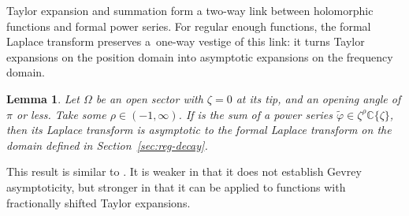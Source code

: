 \documentclass[10pt,a4paper]{amsart}
\newcommand{\singexp}[2]{\mathcal{H}L^\infty_{#1, #2}}
\newcommand{\C}{\mathbb{C}}
\newcommand{\series}[1]{\tilde{#1}}
\newcommand{\laplace}{\mathcal{L}}
\numberwithin{equation}{section}
\newtheorem{Lemma}[Theorem]{Lemma}
\begin{document}
Taylor expansion and summation form a two-way link between holomorphic functions and formal power series. For regular enough functions, the formal Laplace transform preserves a~one-way vestige of this link: it turns Taylor expansions on the position domain into asymptotic expansions on the frequency domain.
\begin{Lemma}\label{lem:laplace-bridge}
Let $\Omega$ be an open sector with $\zeta = 0$ at its tip, and an opening angle of $\pi$ or less. Take some $\rho \in (-1,\infty)$. If \smash{$\varphi \in \singexp{\rho}{\Lambda}(\Omega)$} is the sum of a power series $\series{\varphi} \in \zeta^\rho \C\{\zeta\}$, then its Laplace transform \smash{$\Phi = \laplace_{\zeta, 0}^\theta \varphi$} is asymptotic to the formal Laplace transform \smash{$\series{\Phi} = \laplace_{\zeta, 0}^\theta \series{\varphi}$} on the domain  defined in Section~{\rm\ref{sec:reg-decay}}.
\end{Lemma}
\begin{Remark}
This result is similar to \cite[Theorem~5.20]{diverg-resurg-i}. It is weaker in that it does not establish Gevrey asymptoticity, but stronger in that it can be applied to functions with fractionally shifted Taylor expansions.
\end{Remark}
\end{document}
